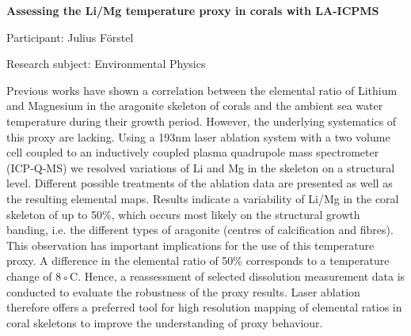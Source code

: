 \begin{minipage}[t]{1.0\textwidth}

\begin{center}

{{\large\bfseries Assessing the Li/Mg temperature proxy in corals with LA-ICPMS}\par}

\end{center}

{\noindent Participant: Julius Förstel\par} 

{\noindent Research subject: Environmental Physics\par}\medskip

\noindent Previous works have shown a correlation between the elemental ratio of Lithium and Magnesium in the aragonite skeleton of corals and the ambient sea water temperature during their growth period. However, the underlying systematics of this proxy are lacking.
Using a 193nm laser ablation system with a two volume cell coupled to an inductively coupled plasma quadrupole mass spectrometer (ICP-Q-MS) we resolved variations of Li and Mg in the skeleton on a structural level. Different possible treatments of the ablation data are presented as well as the resulting elemental maps. Results indicate a variability of Li/Mg in the coral skeleton of up to 50\%, which occurs most likely on the structural growth banding, i.e. the different types of aragonite (centres of calcification and fibres). This observation has important implications
for the use of this temperature proxy. A difference in the elemental ratio of 50\% corresponds to a temperature change of 8◦C. Hence, a reassessment of selected dissolution measurement data is conducted to evaluate the robustness of the proxy results.
Laser ablation therefore offers a preferred tool for high resolution mapping of elemental ratios in coral skeletons to improve the understanding of proxy behaviour.\par\end{minipage}

\hfill 

